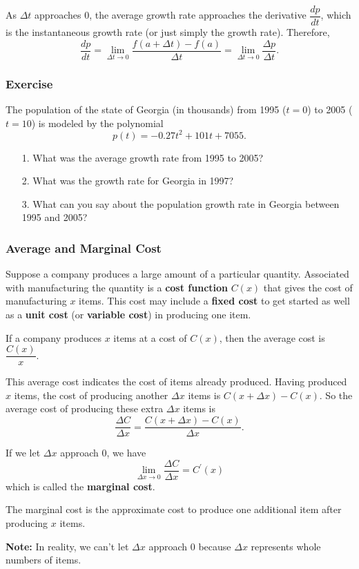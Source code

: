 \documentclass[14pt]{beamer}
\begin{document}
\begin{frame}

As $\Delta t$ approaches 0, the average growth rate approaches the derivative $\dfrac{dp}{dt}$, which is the instantaneous growth rate (or just simply the growth rate).  Therefore,
$$\frac{dp}{dt}=\lim_{\Delta t \to 0} \frac{f(a+\Delta t)-f(a)}{\Delta t} = \lim_{\Delta t \to 0} \frac{\Delta p}{\Delta t}.$$
\end{frame}

\begin{frame}
\frametitle{Exercise}
The population of the state of Georgia (in thousands) from 1995 ($t=0$) to 2005 ($t=10$) is modeled by the polynomial 
$$p(t)=-0.27t^2+101t+7055.$$

\begin{itemize}

\item[1.] What was the average growth rate from 1995 to 2005?
\item[2.] What was the growth rate for Georgia in 1997?
\item[3.] What can you say about the population growth rate in Georgia between 1995 and 2005?

\end{itemize}
\end{frame}

\begin{frame}
\frametitle{Average and Marginal Cost}
Suppose a company produces a large amount of a particular quantity.  Associated with manufacturing the quantity is a {\bf cost function} $C(x)$ that gives the cost of manufacturing $x$ items.  This cost may include a {\bf fixed cost} to get started as well as a {\bf unit cost} (or {\bf variable cost}) in producing one item.
\end{frame}

\begin{frame}

If a company produces $x$ items at a cost of $C(x)$, then the average cost is $\dfrac{C(x)}{x}.$

\bigskip

This average cost indicates the cost of items already produced.  Having produced $x$ items, the cost of producing another $\Delta x$ items is 
$C(x+\Delta x)-C(x)$.  So the average cost of producing these extra $\Delta x$ items is 
$$\frac{\Delta C}{\Delta x}=\frac{C(x+\Delta x)-C(x)}{\Delta x}.$$
\end{frame}

\begin{frame}
If we let $\Delta x$ approach 0, we have
$$\lim_{\Delta x \to 0}\frac{\Delta C}{\Delta x}=C^{\prime}(x)$$
which is called the {\bf marginal cost}.  

\bigskip 

The marginal cost is the approximate cost to produce one additional item after producing $x$ items.

\bigskip

{\bf Note:}  In reality, we can't let $\Delta x$ approach 0 because $\Delta x$ represents whole numbers of items.
\end{frame}
\end{document}
